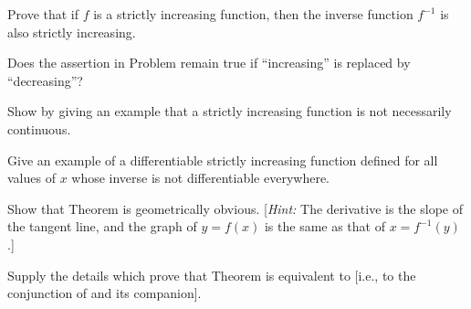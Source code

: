 \begin{exercises}

Prove that if $f$ is a strictly increasing function,
then the inverse function $f^{-1}$
is also strictly increasing.

Does the assertion in Problem 
remain true if ``increasing'' is replaced by
``decreasing''?

Show by giving an example that a strictly
increasing function is not necessarily continuous.

Give an example of a differentiable strictly
increasing function defined for all values of $x$
whose inverse is not differentiable everywhere.

Show that Theorem  is geometrically
obvious.
[\emph{Hint:} The derivative is the slope of the tangent
line, and the graph of $y = f(x)$ is the same as
that of $x = f^{-1}(y)$.]

Supply the details which prove that Theorem 
is equivalent to  [i.e., to the conjunction
of  and its companion].

\end{exercises}
